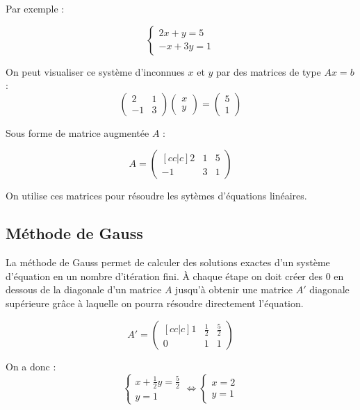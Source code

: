 \documentclass{article}
\begin{document}
Par exemple :

\[\begin{cases}
  2x + y = 5 \\
  -x + 3y = 1
 \end{cases}\]

On peut visualiser ce système d'inconnues $x$ et $y$ par des matrices de type $Ax=b$ :
\[\begin{pmatrix}
  2  & 1 \\
  -1 & 3
 \end{pmatrix}
 \begin{pmatrix}
  x \\
  y
 \end{pmatrix}
 =
 \begin{pmatrix}
  5 \\
  1
 \end{pmatrix}\]

Sous forme de matrice augmentée $A$ :

\[ A =
 \begin{pmatrix}[cc|c]
  2  & 1 & 5 \\
  -1 & 3 & 1
 \end{pmatrix}\]

On utilise ces matrices pour résoudre les sytèmes d'équations linéaires.

\subsection{Méthode de Gauss}

La méthode de Gauss permet de calculer des solutions exactes d'un système d'équation en un nombre d'itération fini.
À chaque étape on doit créer des $0$ en dessous de la diagonale d'un matrice $A$ jusqu'à obtenir une matrice $A'$ diagonale supérieure grâce à laquelle on pourra résoudre directement l'équation.

\[ A' =
 \begin{pmatrix}[cc|c]
  1 & \frac{1}{2} & \frac{5}{2} \\
  0 & 1           & 1
 \end{pmatrix}\]

On a donc :
\[\begin{cases}
  x + \frac{1}{2}y = \frac{5}{2} \\
  y = 1
 \end{cases}
 \iff
 \begin{cases}
  x = 2 \\
  y = 1
 \end{cases}
\]
\end{document}
